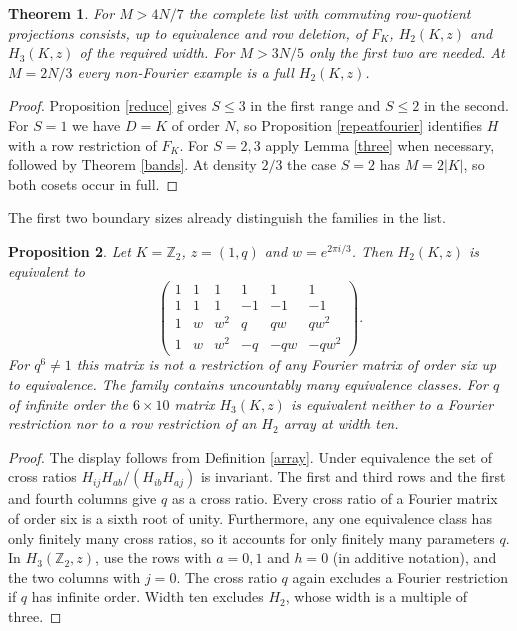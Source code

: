\documentclass[11pt,a4paper]{article}
\newtheorem{thm}{Theorem}[section]
\newtheorem{prop}[thm]{Proposition}
\begin{document}
\begin{thm}\label{classification}
For $M>4N/7$ the complete list with commuting row-quotient projections consists, up to equivalence and row deletion, of $F_K$, $H_2(K,z)$ and $H_3(K,z)$ of the required width. For $M>3N/5$ only the first two are needed. At $M=2N/3$ every non-Fourier example is a full $H_2(K,z)$.
\end{thm}
\begin{proof}
Proposition \ref{reduce} gives $S\leq3$ in the first range and $S\leq2$ in the second. For $S=1$ we have $D=K$ of order $N$, so Proposition \ref{repeatfourier} identifies $H$ with a row restriction of $F_K$. For $S=2,3$ apply Lemma \ref{three} when necessary, followed by Theorem \ref{bands}. At density $2/3$ the case $S=2$ has $M=2|K|$, so both cosets occur in full.
\end{proof}

The first two boundary sizes already distinguish the families in the list.

\begin{prop}\label{boundary}
Let $K=\mathbb Z_2$, $z=(1,q)$ and $w=e^{2\pi i/3}$. Then $H_2(K,z)$ is equivalent to
\[
 \begin{pmatrix}
 1&1&1&1&1&1\\
 1&1&1&-1&-1&-1\\
 1&w&w^2&q&qw&qw^2\\
 1&w&w^2&-q&-qw&-qw^2
\end{pmatrix}.
\]
For $q^6\ne1$ this matrix is not a restriction of any Fourier matrix of order six up to equivalence. The family contains uncountably many equivalence classes. For $q$ of infinite order the $6\times10$ matrix $H_3(K,z)$ is equivalent neither to a Fourier restriction nor to a row restriction of an $H_2$ array at width ten.
\end{prop}
\begin{proof}
The display follows from Definition \ref{array}. Under equivalence the set of cross ratios $H_{ij}H_{ab}/(H_{ib}H_{aj})$ is invariant. The first and third rows and the first and fourth columns give $q$ as a cross ratio. Every cross ratio of a Fourier matrix of order six is a sixth root of unity. Furthermore, any one equivalence class has only finitely many cross ratios, so it accounts for only finitely many parameters $q$. In $H_3(\mathbb Z_2,z)$, use the rows with $a=0,1$ and $h=0$ (in additive notation), and the two columns with $j=0$. The cross ratio $q$ again excludes a Fourier restriction if $q$ has infinite order. Width ten excludes $H_2$, whose width is a multiple of three.
\end{proof}
\end{document}
